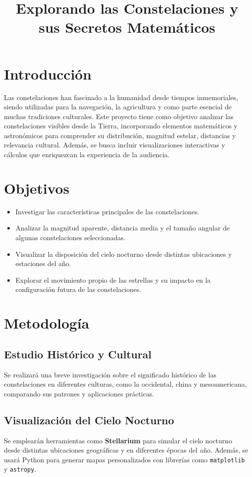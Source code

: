 \documentclass[12pt]{article}
\title{Explorando las Constelaciones y sus Secretos Matem\'aticos}
\author{}
\date{}
\begin{document}
\maketitle

\section*{Introducci\'on}
Las constelaciones han fascinado a la humanidad desde tiempos inmemoriales, siendo utilizadas para la navegaci\'on, la agricultura y como parte esencial de muchas tradiciones culturales. Este proyecto tiene como objetivo analizar las constelaciones visibles desde la Tierra, incorporando elementos matem\'aticos y astron\'omicos para comprender su distribuci\'on, magnitud estelar, distancias y relevancia cultural. Adem\'as, se busca incluir visualizaciones interactivas y c\'alculos que enriquezcan la experiencia de la audiencia.

\section*{Objetivos}
\begin{itemize}
    \item Investigar las caracter\'isticas principales de las constelaciones.
    \item Analizar la magnitud aparente, distancia media y el tama\~no angular de algunas constelaciones seleccionadas.
    \item Visualizar la disposici\'on del cielo nocturno desde distintas ubicaciones y estaciones del a\~no.
    \item Explorar el movimiento propio de las estrellas y su impacto en la configuraci\'on futura de las constelaciones.
\end{itemize}

\section*{Metodolog\'ia}
\subsection*{Estudio Hist\'orico y Cultural}
Se realizar\'a una breve investigaci\'on sobre el significado hist\'orico de las constelaciones en diferentes culturas, como la occidental, china y mesoamericana, comparando sus patrones y aplicaciones pr\'acticas.

\subsection*{Visualizaci\'on del Cielo Nocturno}
Se emplear\'an herramientas como \textbf{Stellarium} para simular el cielo nocturno desde distintas ubicaciones geogr\'aficas y en diferentes \'epocas del a\~no. Adem\'as, se usar\'a Python para generar mapas personalizados con librer\'ias como \texttt{matplotlib} y \texttt{astropy}.
\end{document}
